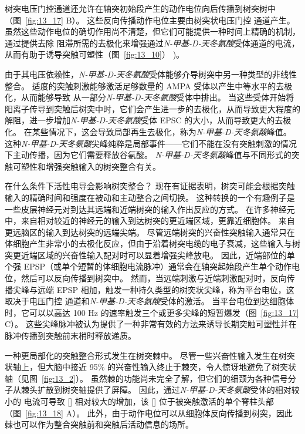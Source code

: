树突电压门控通道还允许在轴突初始段产生的动作电位向后传播到树突树中（图~\ref{fig:13_17} B）。
这些反向传播动作电位主要由树突状电压门控  通道产生。
虽然这些动作电位的确切作用尚不清楚，但它们可能提供一种时间上精确的机制，通过提供去除  阻滞所需的去极化来增强通过\textit{N-甲基-D-天冬氨酸}受体通道的电流，从而有助于诱导突触可塑性（图~\ref{fig:13_10}） )。


由于其电压依赖性，\textit{N-甲基-D-天冬氨酸}受体能够介导树突中另一种类型的非线性整合。
适度的突触刺激能够激活足够数量的 AMPA 受体以产生中等水平的去极化，从而能够导致  从一部分\textit{N-甲基-D-天冬氨酸}受体中排出。
当这些受体开始将阳离子传导到突触后树突中时，它们会产生进一步的去极化，从而导致更大程度的  解阻，进一步增加\textit{N-甲基-D-天冬氨酸}受体 EPSC 的大小，从而导致更大的去极化。
在某些情况下，这会导致局部再生去极化，称为\textit{N-甲基-D-天冬氨酸}峰值。
这种\textit{N-甲基-D-天冬氨酸}尖峰纯粹是局部事件——它们不能在没有突触刺激的情况下主动传播，因为它们需要释放谷氨酸。
\textit{N-甲基-D-天冬氨酸}峰值与不同形式的突触可塑性和增强突触输入的树突整合有关。


在什么条件下活性电导会影响树突整合？
现在有证据表明，树突可能会根据突触输入的精确时间和强度在被动和主动整合之间切换。
这种转换的一个有趣例子是一些皮层神经元对到达其远端和近端树突的输入作出反应的方式。
在许多神经元中，来自相对较近的神经元的输入到达树突的更近端区域，更靠近细胞体。
来自更远脑区的输入到达树突的远端尖端。
尽管远端树突的兴奋性突触输入通常只在体细胞产生非常小的去极化反应，但由于沿着树突电缆的电子衰减，这些输入与树突更近端区域的兴奋性输入配对时可以显着增强尖峰放电。
因此，近端部位的单个强 EPSP（或单个短暂的体细胞电流脉冲）通常会在轴突起始段产生单个动作电位，然后可以反向传播到树突中。
然而，当远端刺激与近端刺激配对时，反向传播尖峰与远端 EPSP 相加，触发一种持久类型的树突状尖峰，称为平台电位，这取决于电压门控  通道和\textit{N-甲基-D-天冬氨酸}受体的激活。
当平台电位到达细胞体时，它可以以高达 100 Hz 的速率触发三个或更多尖峰的短暂爆发（图~\ref{fig:13_17} C）。
这些尖峰脉冲被认为提供了一种非常有效的方法来诱导长期突触可塑性并在脉冲传播到突触前末梢时释放递质。


一种更局部化的突触整合形式发生在树突棘中。
尽管一些兴奋性输入发生在树突状轴上，但大脑中接近 95\% 的兴奋性输入终止于棘突，令人惊讶地避免了树突状轴（见图~\ref{fig:13_2}）。
虽然棘的功能尚未完全了解，但它们的细颈为各种信号分子从棘头扩散到树突轴提供了屏障。
因此，通过\textit{N-甲基-D-天冬氨酸}受体的相对较小的  电流可导致 [] 相对较大的增加，该 [] 位于被突触激活的单个脊柱头部（图~\ref{fig:13_18} A）。
此外，由于动作电位可以从细胞体反向传播到树突，因此棘也可以作为整合突触前和突触后活动信息的场所。


